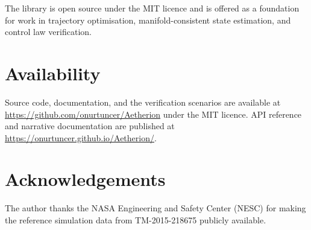 \documentclass[a4paper,10pt]{article}
\theoremstyle{definition}
\begin{document}
The library is open source under the MIT licence and is offered as a
foundation for work in trajectory optimisation, manifold-consistent state
estimation, and control law verification.

\section*{Availability}

Source code, documentation, and the verification scenarios are available at
\url{https://github.com/onurtuncer/Aetherion} under the MIT licence.  API
reference and narrative documentation are published at
\url{https://onurtuncer.github.io/Aetherion/}.

\section*{Acknowledgements}

The author thanks the NASA Engineering and Safety Center (NESC) for making the
reference simulation data from TM-2015-218675 publicly available.



\end{document}
